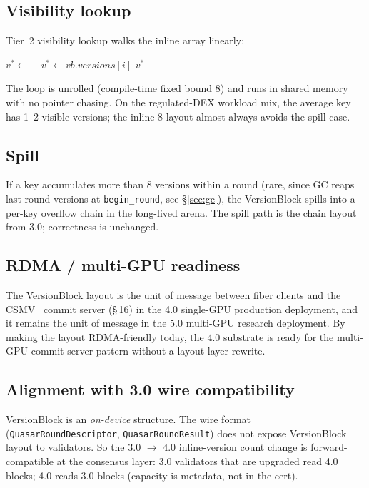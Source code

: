 \subsection{Visibility lookup}

Tier~2 visibility lookup walks the inline array linearly:

\begin{algorithm}[ht]
\caption{\texttt{visible\_version}($\mathit{vb}$, $t$)}
\label{alg:visible}
\begin{algorithmic}[1]
\State $v^* \gets \bot$
      \State $v^* \gets \mathit{vb.versions[i]}$
    \EndIf
  \EndIf
\EndFor
\State \Return $v^*$
\end{algorithmic}
\end{algorithm}

The loop is unrolled (compile-time fixed bound 8) and runs in shared
memory with no pointer chasing. On the regulated-DEX workload mix, the
average key has 1--2 visible versions; the inline-8 layout almost
always avoids the spill case.

\subsection{Spill}

If a key accumulates more than 8 versions within a round (rare, since
GC reaps last-round versions at \texttt{begin\_round}, see
\S\ref{sec:gc}), the VersionBlock spills into a per-key overflow chain
in the long-lived arena. The spill path is the chain layout from 3.0;
correctness is unchanged.

\subsection{RDMA / multi-GPU readiness}

The VersionBlock layout is the unit of message between fiber clients
and the CSMV~\cite{csmv} commit server (\S\,16) in the 4.0
single-GPU production deployment, and it remains the unit of message
in the 5.0 multi-GPU research deployment. By making the layout
RDMA-friendly today, the 4.0 substrate is ready for the multi-GPU
commit-server pattern without a layout-layer rewrite.

\subsection{Alignment with 3.0 wire compatibility}

VersionBlock is an \emph{on-device} structure. The wire format
(\texttt{QuasarRoundDescriptor}, \texttt{QuasarRoundResult}) does not
expose VersionBlock layout to validators. So the 3.0 $\rightarrow$ 4.0
inline-version count change is forward-compatible at the consensus
layer: 3.0 validators that are upgraded read 4.0 blocks; 4.0 reads
3.0 blocks (capacity is metadata, not in the cert).


